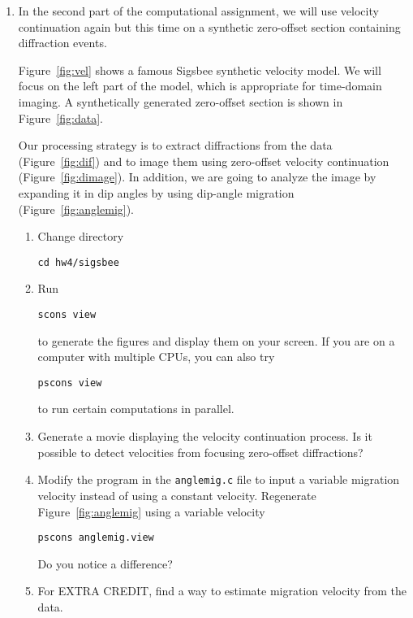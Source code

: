 \begin{enumerate}
\lstset{language=python,numbers=left,numberstyle=\tiny,showstringspaces=false}


\item In the second part of the computational assignment, we will use velocity continuation again but
  this time on a synthetic zero-offset section containing diffraction
  events.

  Figure~\ref{fig:vel} shows a famous Sigsbee synthetic velocity
  model. We will focus on the left part of the model, which is
  appropriate for time-domain imaging. A synthetically generated
  zero-offset section is shown in Figure~\ref{fig:data}. 
  
  Our processing strategy is to extract diffractions from the data
  (Figure~\ref{fig:dif}) and to image them using zero-offset velocity
  continuation (Figure~\ref{fig:dimage}). In addition, we are going to
  analyze the image by expanding it in dip angles by using dip-angle
  migration (Figure~\ref{fig:anglemig}).


\begin{enumerate}
\item Change directory 
\begin{verbatim}
cd hw4/sigsbee
\end{verbatim}
\item Run
\begin{verbatim}
scons view
\end{verbatim}
to generate the figures and display them on your screen.
If you are on a computer with multiple CPUs, you
can also try
\begin{verbatim}
pscons view
\end{verbatim}
to run certain computations in parallel.
\item Generate a movie displaying the velocity continuation process. Is it possible to detect velocities from focusing zero-offset diffractions?
\item Modify the program in the \texttt{anglemig.c} file to input a variable migration velocity instead of using a constant velocity. 
Regenerate Figure~\ref{fig:anglemig} using a variable velocity 
\begin{verbatim}
pscons anglemig.view
\end{verbatim}
Do you notice a difference?
\item For EXTRA CREDIT, find a way to estimate migration velocity from the data.
\end{enumerate}


\end{enumerate}
